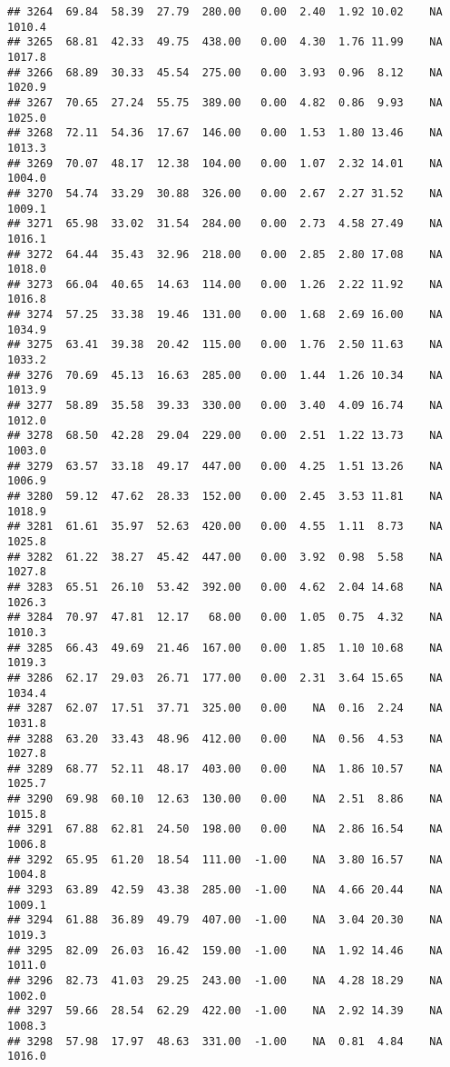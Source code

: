 \documentclass{article}\usepackage{graphicx, color}
\makeatletter
\newenvironment{kframe}{%
 \def\at@end@of@kframe{}%
 \ifinner\ifhmode%
  \def\at@end@of@kframe{\end{minipage}}%
  \begin{minipage}{\columnwidth}%
 \fi\fi%
 \def\FrameCommand##1{\hskip\@totalleftmargin \hskip-\fboxsep
 \colorbox{shadecolor}{##1}\hskip-\fboxsep
     \hskip-\linewidth \hskip-\@totalleftmargin \hskip\columnwidth}%
 \MakeFramed {\advance\hsize-\width
   \@totalleftmargin\z@ \linewidth\hsize
   \@setminipage}}%
 {\par\unskip\endMakeFramed%
 \at@end@of@kframe}
\newenvironment{knitrout}{}{} %
\makeatother
\begin{document}
\begin{knitrout}
\begin{kframe}
\begin{verbatim}
## 3264  69.84  58.39  27.79  280.00   0.00  2.40  1.92 10.02    NA 1010.4
## 3265  68.81  42.33  49.75  438.00   0.00  4.30  1.76 11.99    NA 1017.8
## 3266  68.89  30.33  45.54  275.00   0.00  3.93  0.96  8.12    NA 1020.9
## 3267  70.65  27.24  55.75  389.00   0.00  4.82  0.86  9.93    NA 1025.0
## 3268  72.11  54.36  17.67  146.00   0.00  1.53  1.80 13.46    NA 1013.3
## 3269  70.07  48.17  12.38  104.00   0.00  1.07  2.32 14.01    NA 1004.0
## 3270  54.74  33.29  30.88  326.00   0.00  2.67  2.27 31.52    NA 1009.1
## 3271  65.98  33.02  31.54  284.00   0.00  2.73  4.58 27.49    NA 1016.1
## 3272  64.44  35.43  32.96  218.00   0.00  2.85  2.80 17.08    NA 1018.0
## 3273  66.04  40.65  14.63  114.00   0.00  1.26  2.22 11.92    NA 1016.8
## 3274  57.25  33.38  19.46  131.00   0.00  1.68  2.69 16.00    NA 1034.9
## 3275  63.41  39.38  20.42  115.00   0.00  1.76  2.50 11.63    NA 1033.2
## 3276  70.69  45.13  16.63  285.00   0.00  1.44  1.26 10.34    NA 1013.9
## 3277  58.89  35.58  39.33  330.00   0.00  3.40  4.09 16.74    NA 1012.0
## 3278  68.50  42.28  29.04  229.00   0.00  2.51  1.22 13.73    NA 1003.0
## 3279  63.57  33.18  49.17  447.00   0.00  4.25  1.51 13.26    NA 1006.9
## 3280  59.12  47.62  28.33  152.00   0.00  2.45  3.53 11.81    NA 1018.9
## 3281  61.61  35.97  52.63  420.00   0.00  4.55  1.11  8.73    NA 1025.8
## 3282  61.22  38.27  45.42  447.00   0.00  3.92  0.98  5.58    NA 1027.8
## 3283  65.51  26.10  53.42  392.00   0.00  4.62  2.04 14.68    NA 1026.3
## 3284  70.97  47.81  12.17   68.00   0.00  1.05  0.75  4.32    NA 1010.3
## 3285  66.43  49.69  21.46  167.00   0.00  1.85  1.10 10.68    NA 1019.3
## 3286  62.17  29.03  26.71  177.00   0.00  2.31  3.64 15.65    NA 1034.4
## 3287  62.07  17.51  37.71  325.00   0.00    NA  0.16  2.24    NA 1031.8
## 3288  63.20  33.43  48.96  412.00   0.00    NA  0.56  4.53    NA 1027.8
## 3289  68.77  52.11  48.17  403.00   0.00    NA  1.86 10.57    NA 1025.7
## 3290  69.98  60.10  12.63  130.00   0.00    NA  2.51  8.86    NA 1015.8
## 3291  67.88  62.81  24.50  198.00   0.00    NA  2.86 16.54    NA 1006.8
## 3292  65.95  61.20  18.54  111.00  -1.00    NA  3.80 16.57    NA 1004.8
## 3293  63.89  42.59  43.38  285.00  -1.00    NA  4.66 20.44    NA 1009.1
## 3294  61.88  36.89  49.79  407.00  -1.00    NA  3.04 20.30    NA 1019.3
## 3295  82.09  26.03  16.42  159.00  -1.00    NA  1.92 14.46    NA 1011.0
## 3296  82.73  41.03  29.25  243.00  -1.00    NA  4.28 18.29    NA 1002.0
## 3297  59.66  28.54  62.29  422.00  -1.00    NA  2.92 14.39    NA 1008.3
## 3298  57.98  17.97  48.63  331.00  -1.00    NA  0.81  4.84    NA 1016.0

\end{verbatim}
\end{kframe}
\end{knitrout}
\end{document}
